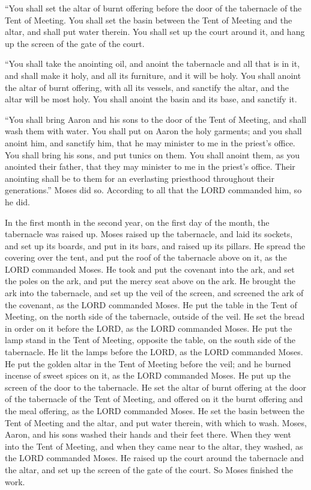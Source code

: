 \myverse{}“You shall set the altar of burnt offering before the door of
the tabernacle of the Tent of Meeting.
\myverse{}You shall set the basin between the Tent of Meeting and the altar, and shall
put water therein.
\myverse{}You shall set up the court around it, and hang up the screen of the gate of
the court.


\myverse{}“You shall take the anointing oil, and anoint the tabernacle and
all that is in it, and shall make it holy, and all its furniture, and it will be holy.
\myverse{}You shall anoint the altar of burnt offering, with all its vessels, and sanctify
the altar, and the altar will be most holy.
\myverse{}You shall anoint the basin and its base, and sanctify it.


\myverse{}“You shall bring Aaron and his sons to the door of the Tent
of Meeting, and shall wash them with water.
\myverse{}You shall put on Aaron the holy garments; and you shall anoint him, and sanctify
him, that he may minister to me in the priest’s office.
\myverse{}You shall bring his sons, and put tunics on them.
\myverse{}You shall anoint them, as you anointed their father, that they may minister
to me in the priest’s office. Their anointing shall be to them for an everlasting priesthood throughout
their generations.”
\myverse{}Moses did so. According to all that the LORD commanded him, so he did.


\myverse{}In the first month in the second year, on the first day of the
month, the tabernacle was raised up.
\myverse{}Moses raised up the tabernacle, and laid its sockets, and set up its boards,
and put in its bars, and raised up its pillars.
\myverse{}He spread the covering over the tent, and put the roof of the tabernacle
above on it, as the LORD commanded Moses.
\myverse{}He took and put the covenant into the ark, and set the poles on the ark,
and put the mercy seat above on the ark.
\myverse{}He brought the ark into the tabernacle, and set up the veil of the screen,
and screened the ark of the covenant, as the LORD commanded Moses.
\myverse{}He put the table in the Tent of Meeting, on the north side of the tabernacle,
outside of the veil.
\myverse{}He set the bread in order on it before the LORD, as the LORD commanded Moses.
\myverse{}He put the lamp stand in the Tent of Meeting, opposite the table, on the
south side of the tabernacle.
\myverse{}He lit the lamps before the LORD, as the LORD commanded Moses.
\myverse{}He put the golden altar in the Tent of Meeting before the veil;
\myverse{}and he burned incense of sweet spices on it, as the LORD commanded Moses.
\myverse{}He put up the screen of the door to the tabernacle.
\myverse{}He set the altar of burnt offering at the door of the tabernacle of the Tent
of Meeting, and offered on it the burnt offering and the meal offering, as the LORD commanded Moses.
\myverse{}He set the basin between the Tent of Meeting and the altar, and put water
therein, with which to wash.
\myverse{}Moses, Aaron, and his sons washed their hands and their feet there.
\myverse{}When they went into the Tent of Meeting, and when they came near to the altar,
they washed, as the LORD commanded Moses.
\myverse{}He raised up the court around the tabernacle and the altar, and set up the
screen of the gate of the court. So Moses finished the work.


